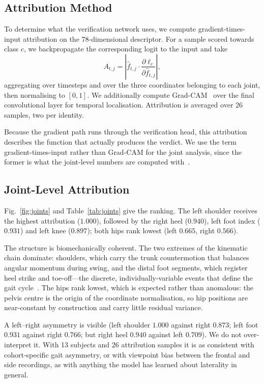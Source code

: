 \documentclass[journal]{IEEEtran}
\begin{document}
\subsection{Attribution Method}

To determine what the verification network uses, we compute gradient-times-input
attribution on the 78-dimensional descriptor. For a sample scored towards class
$c$, we backpropagate the corresponding logit to the input and take
\begin{equation}
A_{t,j} = \left| \hat{f}_{t,j} \cdot
\frac{\partial \ell_c}{\partial \hat{f}_{t,j}} \right|,
\end{equation}
aggregating over timesteps and over the three coordinates belonging to each
joint, then normalising to $[0,1]$. We additionally compute
Grad-CAM~\cite{gradcam} over the final convolutional layer for temporal
localisation. Attribution is averaged over 26 samples, two per identity.

Because the gradient path runs through the verification head, this attribution
describes the function that actually produces the verdict. We use the term
gradient-times-input rather than Grad-CAM for the joint analysis, since the
former is what the joint-level numbers are computed
with~\cite{shrikumar,sundararajan}.

\subsection{Joint-Level Attribution}

Fig.~\ref{fig:joints} and Table~\ref{tab:joints} give the ranking. The left
shoulder receives the highest attribution ($1.000$), followed by the right heel
($0.940$), left foot index ($0.931$) and left knee ($0.897$); both hips rank
lowest (left $0.665$, right $0.566$).

The structure is biomechanically coherent. The two extremes of the kinematic
chain dominate: shoulders, which carry the trunk countermotion that balances
angular momentum during swing, and the distal foot segments, which register
heel strike and toe-off---the discrete, individually-variable events that
define the gait cycle~\cite{perry_gait,winter_biomech}. The hips rank lowest,
which is expected rather than anomalous: the pelvis centre is the origin of the
coordinate normalisation, so hip positions are near-constant by construction
and carry little residual variance.

A left--right asymmetry is visible (left shoulder $1.000$ against right
$0.873$; left foot $0.931$ against right $0.766$; but right heel $0.940$
against left $0.709$). We do not over-interpret it. With 13 subjects and 26
attribution samples it is as consistent with cohort-specific gait asymmetry, or
with viewpoint bias between the frontal and side recordings, as with anything
the model has learned about laterality in general.
\end{document}
